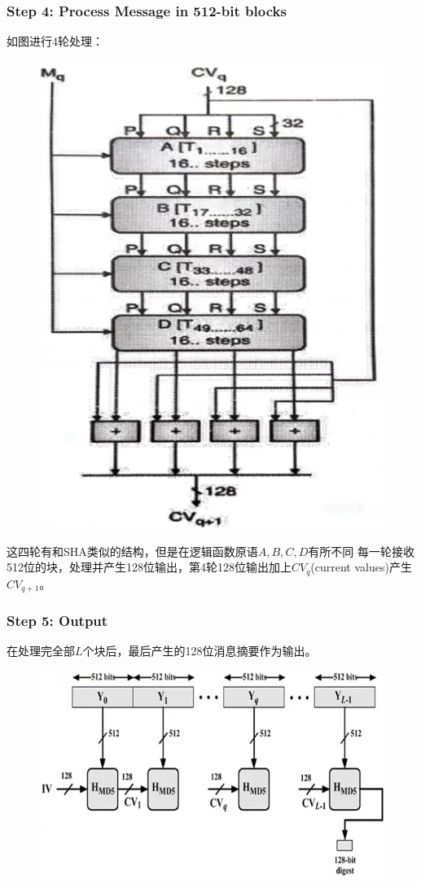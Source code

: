 \documentclass[UTF8, a4paper, 11pt]{article}
\begin{document}
\subsubsection{Step 4: Process Message in 512-bit blocks}
如图进行4轮处理：
\begin{figure}[H]
    \centering
    \includegraphics[width = 0.3 \textwidth]{ABCD.png}
\end{figure}
这四轮有和SHA类似的结构，但是在逻辑函数原语$A,B,C,D$有所不同
每一轮接收512位的块，处理并产生128位输出，第4轮128位输出加上$CV_q$(current values)产生$CV_{q+1}$。
\subsubsection{Step 5: Output}
在处理完全部$L$个块后，最后产生的128位消息摘要作为输出。
\begin{figure}[H]
    \centering
    \includegraphics[width = 0.8 \textwidth]{whole.png}
\end{figure}
\end{document}
